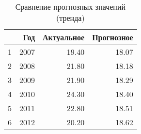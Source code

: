 \begin{table}[ht]
\centering
\begin{tabular}{rrrr}
  \hline
 & Год & Актуальное & Прогнозное \\ 
  \hline
1 & 2007 & 19.40 & 18.07 \\ 
  2 & 2008 & 21.80 & 18.18 \\ 
  3 & 2009 & 21.90 & 18.29 \\ 
  4 & 2010 & 24.30 & 18.40 \\ 
  5 & 2011 & 22.80 & 18.51 \\ 
  6 & 2012 & 20.20 & 18.62 \\ 
   \hline
\end{tabular}
\caption{Сравнение прогнозных значений (тренда)} 
\label{table:prediction_trend}
\end{table}
